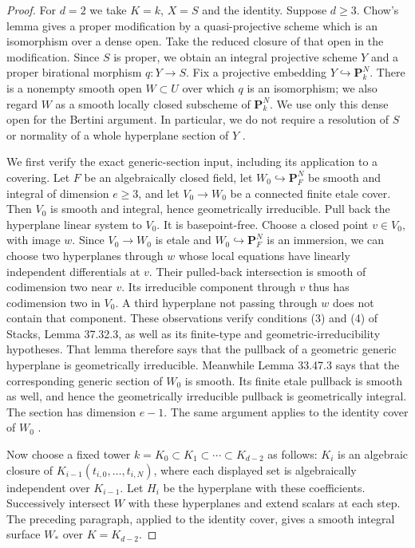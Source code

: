 \begin{proof}
For $d=2$ we take $K=k$, $X=S$ and the identity. Suppose $d\ge3$.
Chow's lemma gives a proper modification by a quasi-projective scheme
which is an isomorphism over a dense open. Take the reduced closure of
that open in the modification. Since $S$ is proper, we obtain an
integral projective scheme $Y$ and a proper birational morphism
$q:Y\to S$. Fix a projective embedding $Y\hookrightarrow\mathbf P^N_k$.
There is a nonempty smooth open $W\subset U$ over which $q$ is an
isomorphism; we also regard $W$ as a smooth locally closed subscheme of
$\mathbf P^N_k$. We use only this dense open for the Bertini argument.
In particular, we do not require a resolution of $S$ or normality of a
whole hyperplane section of $Y$
\citep[Tags 0200 and 0FD6]{StacksDGenericSurface}.

We first verify the exact generic-section input, including its application
to a covering. Let $F$ be an algebraically closed field, let
$W_0\hookrightarrow\mathbf P^N_F$ be smooth and integral of dimension
$e\ge3$, and let $V_0\to W_0$ be a connected finite etale cover.
Then $V_0$ is smooth and integral, hence geometrically irreducible.
Pull back the hyperplane linear system to $V_0$. It is basepoint-free.
Choose a closed point $v\in V_0$, with image $w$. Since $V_0\to W_0$
is etale and $W_0\hookrightarrow\mathbf P^N_F$ is an immersion, we can
choose two hyperplanes through $w$ whose local equations have linearly
independent differentials at $v$. Their pulled-back intersection is
smooth of codimension two near $v$. Its irreducible component through
$v$ thus has codimension two in $V_0$. A third hyperplane not passing
through $w$ does not contain that component. These observations verify
conditions (3) and (4) of Stacks, Lemma 37.32.3, as well as its finite-type
and geometric-irreducibility hypotheses. That lemma therefore says that
the pullback of a geometric generic hyperplane is geometrically
irreducible. Meanwhile Lemma 33.47.3 says that the corresponding generic
section of $W_0$ is smooth. Its finite etale pullback is smooth as well,
and hence the geometrically irreducible pullback is geometrically
integral. The section has dimension $e-1$. The same argument applies
to the identity cover of $W_0$
\citep[Tags 0G4F and 0FD6, full proofs]{StacksDGenericSurface}.

Now choose a fixed tower $k=K_0\subset K_1\subset\cdots\subset K_{d-2}$
as follows: $K_i$ is an algebraic closure of
$K_{i-1}(t_{i,0},\ldots,t_{i,N})$, where each displayed set is
algebraically independent over $K_{i-1}$. Let $H_i$ be the hyperplane
with these coefficients. Successively intersect $W$ with these
hyperplanes and extend scalars at each step. The preceding paragraph,
applied to the identity cover, gives a smooth integral surface $W_*$
over $K=K_{d-2}$.


\end{proof}
